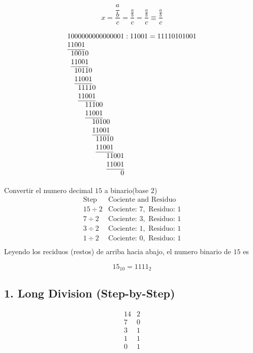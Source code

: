 \documentclass[10pt,a4paper]{article}
\begin{document}
\[ x
  = \dfrac{\dfrac{a}{b}}{c}
  = \dfrac{\frac{\textstyle a}{\textstyle b}}{c}
  = \dfrac{\frac{a}{b}}{c}
  \equiv \dfrac{\tfrac{a}{b}}{c}
\]



\[\setlength{\arraycolsep}{0pt}
\begin{array}[t]{*{16}{l}}
	1&0&0&0&0&0&0&0&0&0&0&0&0&0&0&1\\
	1&1&0&0&1&\\ \cline{1-5}
	&1&0&0&1&0\\
	&1&1&0&0&1&&&&&&&&&&\\\cline{2-6}
	&&1&0&1&1&0&&&&&&&&&\\
	&&1&1&0&0&1&&&&&&&&&\\\cline{3-7}
	&&&1&1&1&1&0&&&&&&&&\\
	&&&1&1&0&0&1&&&&&&&&\\\cline{4-8}
	&&&&&1&1&1&0&0&&&&&&\\
	&&&&&1&1&0&0&1&&&&&&\\\cline{6-10}
	&&&&&&&1&0&1&0&0&&&&\\
	&&&&&&&1&1&0&0&1&&&&\\\cline{8-12}
	&&&&&&&&1&1&0&1&0&&&\\
	&&&&&&&&1&1&0&0&1&&&\\\cline{9-13}
	&&&&&&&&&&&1&1&0&0&1\\
	&&&&&&&&&&&1&1&0&0&1\\\cline{12-16}
	&&&&&&&&&&&&&&&0\\
\end{array}:11001=11110101001
\]


Convertir el numero decimal \(15\)  a binario(base \(2\))
\[
\begin{array}{c|c}
\text{Step} & \text{Cociente and Residuo} \\ \hline
15 \div 2 & \text{Cociente: } 7, \text{ Residuo: } 1 \\
7 \div 2 & \text{Cociente: } 3, \text{ Residuo: } 1 \\
3 \div 2 & \text{Cociente: } 1, \text{ Residuo: } 1 \\
1 \div 2 & \text{Cociente: } 0, \text{ Residuo: } 1 \\
\end{array}
\]
Leyendo los reciduos (restos) de arriba hacia abajo, el numero binario de  \(15\)  es

\[
15_{10} = 1111_2
\]
\subsection*{1. Long Division (Step-by-Step)}
\[
\begin{array}{r|l}
14 & 2 \\
\hline
7 & 0 \\ 
3 & 1 \\ 
1 & 1 \\ 
0 & 1 \\ 
\end{array}
\]
\end{document}
